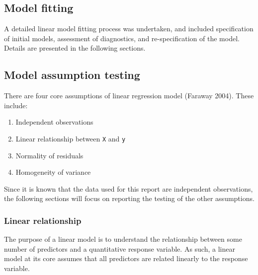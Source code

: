 \documentclass{article}
\begin{document}
\hypertarget{model-fitting}{%
\subsection{Model fitting}\label{model-fitting}}

A detailed linear model fitting process was undertaken, and included
specification of initial models, assessment of diagnostics, and
re-specification of the model. Details are presented in the following
sections.

\hypertarget{model-assumption-testing}{%
\subsection{Model assumption testing}\label{model-assumption-testing}}

There are four core assumptions of linear regression model (Faraway
2004). These include:

\begin{enumerate}
\def\labelenumi{\arabic{enumi}.}
\tightlist
\item
  Independent observations
\item
  Linear relationship between \texttt{X} and \texttt{y}
\item
  Normality of residuals
\item
  Homogeneity of variance
\end{enumerate}

Since it is known that the data used for this report are independent
observations, the following sections will focus on reporting the testing
of the other assumptions.

\hypertarget{linear-relationship}{%
\subsubsection{Linear relationship}\label{linear-relationship}}

The purpose of a linear model is to understand the relationship between
some number of predictors and a quantitative response variable. As such,
a linear model at its core assumes that all predictors are related
linearly to the response variable.
\end{document}
